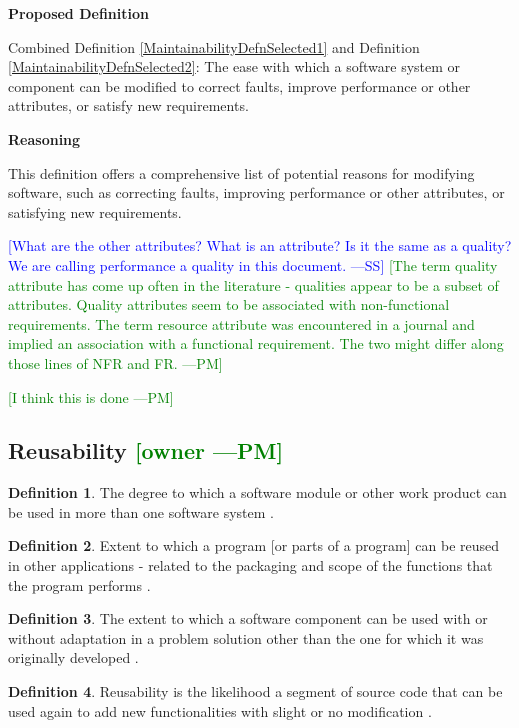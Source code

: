 \documentclass[letterpaper,cleveref]{lipics-v2019}
\newcommand{\authornote}[3]{\textcolor{#1}{[#3 ---#2]}}
\newcommand{\authornote}[3]{}
\newcommand{\wss}[1]{\authornote{blue}{SS}{#1}} %
\newcommand{\pmi}[1]{\authornote{green}{PM}{#1}} %
\theoremstyle{definition}
\newtheorem{defn}{Definition}
\begin{document}
\noindent \textbf{Proposed Definition}

Combined Definition \ref{MaintainabilityDefnSelected1} and Definition
\ref{MaintainabilityDefnSelected2}: The ease with which a software system or
component can be modified to correct faults, improve performance or other
attributes, or satisfy new requirements.

\noindent \textbf{Reasoning}

This definition offers a comprehensive list of potential reasons for modifying
software, such as correcting faults, improving performance or other attributes,
or satisfying new requirements.

\wss{What are the other attributes?  What is an attribute?  Is it the
	same as a quality?  We are calling performance a quality in this document.}
\pmi{The term quality attribute has come up often in the literature - qualities
	appear to be a subset of attributes. Quality attributes seem to be associated
	with non-functional requirements. The term resource attribute was encountered in
	a journal and implied an association with a functional requirement. The two
	might differ along those lines of NFR and FR.}

\pmi{I think this is done}

\subsection{{Reusability} \pmi{owner}}

\begin{defn} 
	The degree to which a software module or other work product can be used in more
	than one software system \citep{IEEEStdGlossarySET1990}. 
\end{defn}
\begin{defn}
	Extent to which a program [or parts of a program] can be reused in other
	applications - related to the packaging and scope of the functions that the
	program performs \citep{pressman2005software}.
\end{defn}
\begin{defn} \label{ReusabilityDefnSelected}
	The extent to which a software component can be used with or without adaptation
	in a problem solution other than the one for which it was originally developed
	\citep{kalagiakos2003non}.
\end{defn}
\begin{defn}
	Reusability is the likelihood a segment of source code that can be used again to
	add new functionalities with slight or no modification \citep{sandhu2010survey}.
\end{defn}
\end{document}
